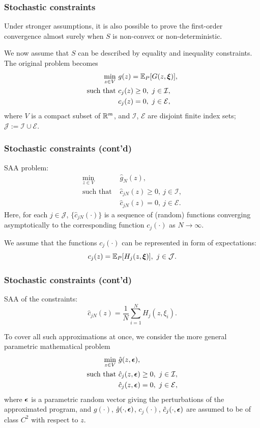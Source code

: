 \documentclass[aspectratio=169]{beamer}
\begin{document}
\begin{frame}
\frametitle{Stochastic constraints}

Under stronger assumptions, it is also possible to prove the first-order convergence almost surely when $S$ is non-convex or non-deterministic.

\mbox{}

We now assume that $S$ can be described by equality and inequality constraints.
The original problem becomes
\begin{align*}
\min_{z \in V}\ & g(z) = {\mathbb{E}}_P[G(z, {\boldsymbol{\xi}})],\\
\text{such that } & c_j(z) \geq 0,\ j \in \mathcal{I},\\
& c_j(z) = 0,\ j \in \mathcal{E},
\end{align*}
where $V$ is a compact subset of $\mathbb{R}^m$, and $\mathcal{I}$, $\mathcal{E}$ are disjoint finite index sets; $\mathcal{J} := \mathcal{I} \cup \mathcal{E}$.

\end{frame}

\begin{frame}
\frametitle{Stochastic constraints (cont'd)}

SAA problem:
\begin{align*}
\min_{z \in V}\ & \hat{g}_N(z),\\
\text{such that } & \hat{c}_{jN}(z) \geq 0,\ j \in \mathcal{I},\\
& \hat{c}_{jN}(z) = 0,\ j \in \mathcal{E}.
\end{align*}
Here, for each $j \in \mathcal{J}$, $\lbrace \hat{c}_{jN}(\cdot) \rbrace$ is a sequence of (random) functions converging asymptotically to the corresponding function $c_j(\cdot)$ as $N \rightarrow \infty$.

\mbox{}

We assume that the functions $c_j(\cdot)$ can be represented in form of expectations:
\[
c_j(z) = {\mathbb{E}}_P[H_j(z,{\boldsymbol{\xi}})],\ j \in \mathcal{J}.
\]

\end{frame}

\begin{frame}
\frametitle{Stochastic constraints (cont'd)}

SAA of the constraints:
\[
\hat{c}_{jN}(z) = \frac{1}{N} \sum_{i = 1}^N H_j(z,\xi_i).
\]

\mbox{}

To cover all such approximations at once, we consider the more general parametric mathematical problem
\begin{align*}
\min_{z \in V}\ & \hat{g}(z, {\boldsymbol{\epsilon}}),\\
\text{such that } & \hat{c}_j(z, {\boldsymbol{\epsilon}}) \geq 0,\ j \in \mathcal{I},\\
& \hat{c}_j(z, {\boldsymbol{\epsilon}}) = 0,\ j \in \mathcal{E},
\end{align*}
where ${\boldsymbol{\epsilon}}$ is a parametric random vector giving the perturbations of the approximated program, and $g(\cdot)$, $\hat{g}(\cdot, {\boldsymbol{\epsilon}})$, $c_j(\cdot)$, $\hat{c}_j(\cdot, {\boldsymbol{\epsilon}})$ are assumed to be of class $C^2$ with respect to $z$.

\end{frame}
\end{document}

